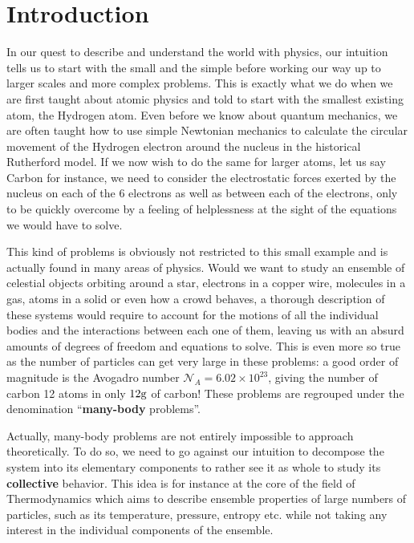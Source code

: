 \chapter*{Introduction}

\label{chap:intro}





In our quest to describe and understand the world with physics, our intuition tells us to start with the small and the simple before working our way up to larger scales and more complex problems. This is exactly what we do when we are first taught about atomic physics and told to start with the smallest existing atom, the Hydrogen atom. Even before we know about quantum mechanics, we are often taught how to use simple Newtonian mechanics to calculate the circular movement of the Hydrogen electron around the nucleus in the historical Rutherford model. If we now wish to do the same for larger atoms, let us say Carbon for instance, we need to consider the electrostatic forces exerted by the nucleus on each of the 6 electrons as well as between each of the electrons, only to be quickly overcome by a feeling of helplessness at the sight of the equations we would have to solve.


This kind of problems is obviously not restricted to this small example and is actually found in many areas of physics. Would we want to study an ensemble of celestial objects orbiting around a star, electrons in a copper wire, molecules in a gas, atoms in a solid or even how a crowd behaves, a thorough description of these systems would require to account for the motions of all the individual bodies and the interactions between each one of them, leaving us with an absurd amounts of degrees of freedom and equations to solve. This is even more so true as the number of particles can get very large in these problems: a good order of magnitude is the Avogadro number $\mathcal{N}_A = 6.02 \times 10^{23}$, giving the number of carbon 12 atoms in only $12\rm{g}$ of carbon! These problems are regrouped under the denomination ``\textbf{many-body} problems''. 


Actually, many-body problems are not entirely impossible to approach theoretically. To do so, we need to go against our intuition to decompose the system into its elementary components to rather see it as whole to study its \textbf{collective} behavior. This idea is for instance at the core of the field of Thermodynamics which aims to describe ensemble properties of large numbers of particles, such as its temperature, pressure, entropy etc. while not taking any interest in the individual components of the ensemble.

